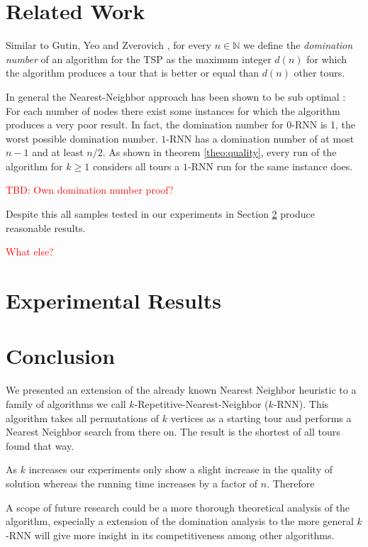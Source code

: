 \documentclass[11pt]{article}
\newcommand{\red}{\textcolor{red}}
\begin{document}
	\section{Related Work}
	\label{sec:related}
	
	Similar to Gutin, Yeo and Zverovich \cite{GUTIN2002}, for every $n \in \mathbb{N}$ we define the \textit{domination number} of an algorithm for the TSP as the maximum integer $d(n)$ for which the algorithm produces a tour that is better or equal than $d(n)$ other tours.
	 
	
	In general the Nearest-Neighbor approach has been shown to be sub optimal \cite{GUTIN2002}: 
	For each number of nodes there exist some instances for which the algorithm produces a very poor result.
	In fact, the domination number for $0$-RNN is 1, the worst possible domination number.
	$1$-RNN has a domination number of at most $n - 1$ and at least $n / 2$.
	As shown in theorem \ref{theo:quality}, every run of the algorithm for $k \geq 1$ considers all tours a $1$-RNN run for the same instance does.
	
	
	\red{TBD: Own domination number proof?}
	
	Despite this all samples tested in our experiments in Section \ref{sec:experimental} produce reasonable results.
	
	\red{What else?}
	\section{Experimental Results}
	\label{sec:experimental}
	
	

	
	\section{Conclusion}
	\label{sec:conclusion}
	
	We presented an extension of the already known Nearest Neighbor heuristic to a family of algorithms we call $k$-Repetitive-Nearest-Neighbor ($k$-RNN). 
	This algorithm takes all permutations of $k$ vertices as a starting tour and performs a Nearest Neighbor search from there on. 
	The result is the shortest of all tours found that way.
	
	As $k$ increases our experiments only show a slight increase in the quality of solution whereas the running time increases by a factor of $n$.
	Therefore
	
	A scope of future research could be a more thorough theoretical analysis of the algorithm, especially a extension of the domination analysis to the more general $k$-RNN will give more insight in its competitiveness among other algorithms.

	
	
	
	
\end{document}
